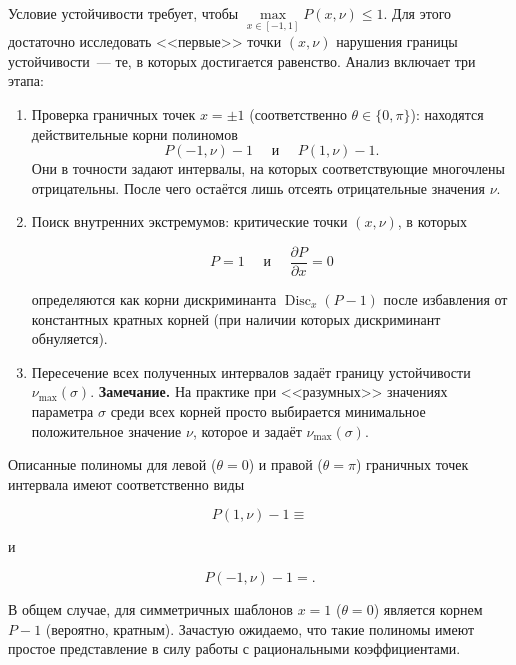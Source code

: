 \documentclass[14pt]{report}
\begin{document}
Условие устойчивости требует, чтобы $\max\limits_{x\in[-1,1]} P(x,\nu) \le 1$. Для этого достаточно исследовать <<первые>> точки $(x, \nu)$ нарушения границы устойчивости~--- те, в которых достигается равенство. Анализ включает три этапа:
\begin{enumerate}
\item Проверка граничных точек $x = \pm 1$ (соответственно $\theta \in \{0, \pi\}$): находятся действительные корни полиномов 
\[
P(-1,\nu)-1\quad \text{ и }\quad P(1,\nu)-1.
\]
Они в точности задают интервалы, на которых соответствующие многочлены отрицательны. После чего остаётся лишь отсеять отрицательные значения $\nu$.

\item Поиск внутренних экстремумов: критические точки $(x,\nu)$, в которых

\[ P=1\quad \text{ и }\quad \frac{\partial P}{\partial x} = 0 \]

определяются как корни дискриминанта $\operatorname{Disc}_x(P-1)$ после избавления от константных кратных корней (при наличии которых дискриминант обнуляется).

\item Пересечение всех полученных интервалов задаёт границу устойчивости $\nu_{\max}(\sigma)$. \textbf{Замечание.} На практике при <<разумных>> значениях параметра $\sigma$ среди всех корней просто выбирается минимальное положительное значение $\nu$, которое и задаёт $\nu_{\max}(\sigma)$.
\end{enumerate}

Описанные полиномы для левой ($\theta = 0$) и правой ($\theta = \pi$) граничных точек интервала имеют соответственно виды

\begin{equation*}
P(1,\nu)-1 \equiv

\end{equation*}

и

\begin{equation}
P(-1,\nu)-1 =
.
\label{eq:right-boundary-stability-condition-polynomial}
\end{equation}

В общем случае, для симметричных шаблонов $x = 1$ ($\theta = 0$) является корнем $P - 1$ (вероятно, кратным). Зачастую ожидаемо, что такие полиномы имеют простое представление в силу работы с рациональными коэффициентами. 
\end{document}
